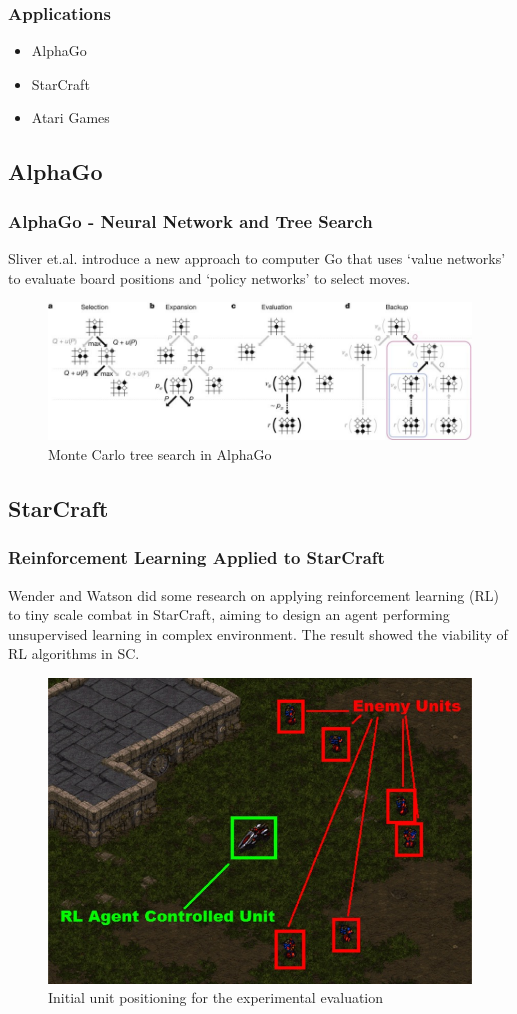 \documentclass{beamer}
\begin{document}
\begin{frame}
  \frametitle{Applications}
  \begin{itemize}
    \item AlphaGo
    \item StarCraft
    \item Atari Games
  \end{itemize}
  

\end{frame}
\subsection{AlphaGo}
\begin{frame}
  \frametitle{AlphaGo - Neural Network and Tree Search}
  Sliver et.al. \cite{5} introduce a new approach to computer Go that uses ‘value networks’ to evaluate board positions and ‘policy networks’ to select moves.
  \begin{figure}
    \includegraphics[width=1\linewidth]{figures/gosearch}
    \caption{ Monte Carlo tree search in AlphaGo}
  \end{figure}
\end{frame}

\subsection{StarCraft}
\begin{frame}
  \frametitle{Reinforcement Learning Applied to StarCraft}
  Wender and Watson did some research \cite{6} on applying reinforcement learning (RL) to tiny scale combat in StarCraft, aiming to design an agent performing unsupervised learning in complex environment. The result showed the viability of RL algorithms in SC.
  \begin{figure}
    \includegraphics[width=0.6\linewidth]{figures/sc}
    \caption{ Initial unit positioning for the experimental evaluation}
  \end{figure}
\end{frame}
\end{document}
